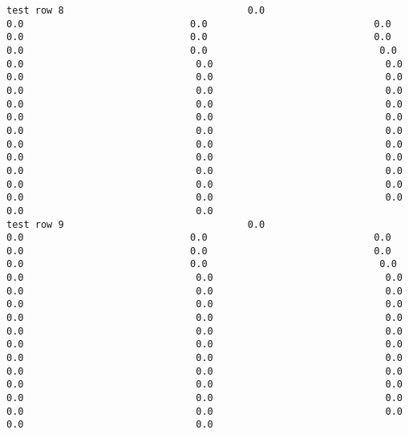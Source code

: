 \documentclass[11pt]{article}
\begin{document}
\begin{verbatim}
test row 8                                0.0                             0.0                             0.0                             0.0                             0.0                             0.0                             0.0                             0.0                             0.0                              0.0                              0.0                              0.0                              0.0                              0.0                              0.0                              0.0                              0.0                              0.0                              0.0                              0.0                              0.0                              0.0                              0.0                              0.0                              0.0                              0.0                              0.0                              0.0                              0.0                              0.0                              0.0                              0.0                              0.0                              0.0                              0.0                              0.0                              0.0                              0.0                              0.0                              0.0                              0.0                              0.0                              0.0                              0.0                              0.0
test row 9                                0.0                             0.0                             0.0                             0.0                             0.0                             0.0                             0.0                             0.0                             0.0                              0.0                              0.0                              0.0                              0.0                              0.0                              0.0                              0.0                              0.0                              0.0                              0.0                              0.0                              0.0                              0.0                              0.0                              0.0                              0.0                              0.0                              0.0                              0.0                              0.0                              0.0                              0.0                              0.0                              0.0                              0.0                              0.0                              0.0                              0.0                              0.0                              0.0                              0.0                              0.0                              0.0                              0.0                              0.0                              0.0

\end{verbatim}
\end{document}

